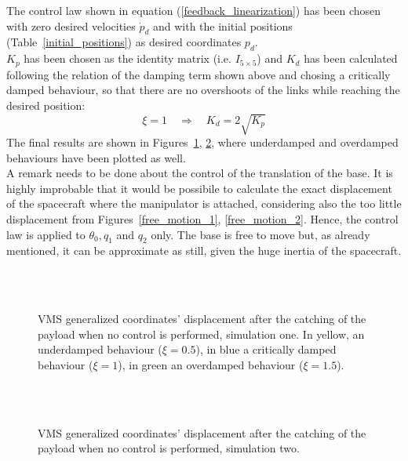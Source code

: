 \documentclass[a4paper,12pt,oneside]{report}
\begin{document}
The control law shown in equation (\ref{feedback_linearization}) has been chosen with zero desired velocities $\dot{p}_d$ and with the initial positions (Table~\ref{initial_positions}) as desired coordinates $p_d$.\\
$K_p$ has been chosen as the identity matrix (i.e. $I_{5\times 5}$) and $K_d$ has been calculated following the relation of the damping term shown above and chosing a critically damped behaviour, so that there are no overshoots of the links while reaching the desired position:
\begin{equation}
  \xi=1 \quad \Rightarrow \quad K_d=2\sqrt{K_p}
  \label{critically_damped}
\end{equation}
The final results are shown in Figures~\ref{controlled_motion_1}, \ref{controlled_motion_2}, where underdamped and overdamped behaviours have been plotted as well.\\
A remark needs to be done about the control of the translation of the base. It is highly improbable that it would be possibile to calculate the exact displacement of the spacecraft where the manipulator is attached, considering also the too little displacement from Figures~\ref{free_motion_1}, \ref{free_motion_2}. Hence, the control law is applied to $\theta_0, q_1$ and $q_2$ only. The base is free to move but, as already mentioned, it can be approximate as still, given the huge inertia of the spacecraft.\\ 
\begin{figure}
  \centering
  \subfloat
  {}\quad
\subfloat
  {} \\
  \subfloat
  {}\quad
  \subfloat
  {}\\
  \subfloat
  {}
  \caption{VMS generalized coordinates' displacement after the catching of the payload when no control is performed, simulation one. In yellow, an underdamped behaviour ($\xi=0.5$), in blue a critically damped behaviour ($\xi=1$), in green an overdamped behaviour ($\xi=1.5$).}
  \label{controlled_motion_1}
\end{figure}
\begin{figure}
  \centering
  \subfloat
  {}\quad
\subfloat
  {} \\
  \subfloat
  {}\quad
  \subfloat
  {}\\
  \subfloat
  {}
  \caption{VMS generalized coordinates' displacement after the catching of the payload when no control is performed, simulation two.}
  \label{controlled_motion_2}
\end{figure}
\newpage
\end{document}
